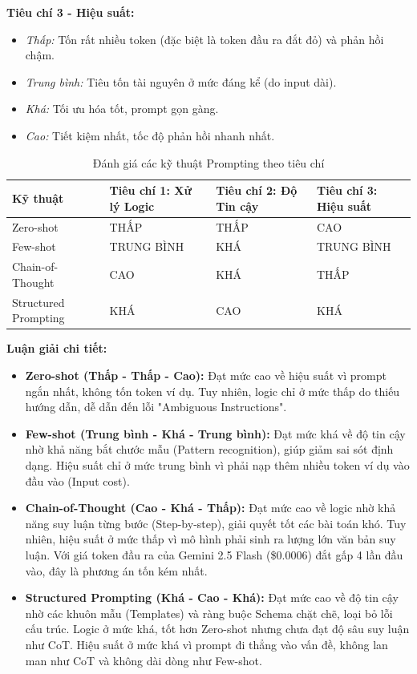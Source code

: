 \textbf{Tiêu chí 3 - Hiệu suất:}
\begin{itemize}
    \item \textit{Thấp:} Tốn rất nhiều token (đặc biệt là token đầu ra đắt đỏ) và phản hồi chậm.
    \item \textit{Trung bình:} Tiêu tốn tài nguyên ở mức đáng kể (do input dài).
    \item \textit{Khá:} Tối ưu hóa tốt, prompt gọn gàng.
    \item \textit{Cao:} Tiết kiệm nhất, tốc độ phản hồi nhanh nhất.
\end{itemize}

{\small
\begin{table}[htp]
\centering
\begin{tabular}{|p{4cm}|p{3.2cm}|p{3.2cm}|p{3.2cm}|}
\hline
\textbf{Kỹ thuật} & \textbf{Tiêu chí 1: Xử lý Logic} & \textbf{Tiêu chí 2: Độ Tin cậy} & \textbf{Tiêu chí 3: Hiệu suất} \\ \hline
Zero-shot & THẤP & THẤP & CAO \\ \hline
Few-shot & TRUNG BÌNH & KHÁ & TRUNG BÌNH \\ \hline
Chain-of-Thought & CAO & KHÁ & THẤP \\ \hline
Structured Prompting & KHÁ & CAO & KHÁ \\ \hline
\end{tabular}
\caption{Đánh giá các kỹ thuật Prompting theo tiêu chí}\label{tab:prompting-evaluation}
\end{table}
}
\textbf{Luận giải chi tiết:}
\begin{itemize}
    \item \textbf{Zero-shot (Thấp - Thấp - Cao):} Đạt mức cao về hiệu suất vì prompt ngắn nhất, không tốn token ví dụ. Tuy nhiên, logic chỉ ở mức thấp do thiếu hướng dẫn, dễ dẫn đến lỗi "Ambiguous Instructions".
    \item \textbf{Few-shot (Trung bình - Khá - Trung bình):} Đạt mức khá về độ tin cậy nhờ khả năng bắt chước mẫu (Pattern recognition), giúp giảm sai sót định dạng. Hiệu suất chỉ ở mức trung bình vì phải nạp thêm nhiều token ví dụ vào đầu vào (Input cost).
    \item \textbf{Chain-of-Thought (Cao - Khá - Thấp):} Đạt mức cao về logic nhờ khả năng suy luận từng bước (Step-by-step), giải quyết tốt các bài toán khó. Tuy nhiên, hiệu suất ở mức thấp vì mô hình phải sinh ra lượng lớn văn bản suy luận. Với giá token đầu ra của Gemini 2.5 Flash (\$0.0006) đắt gấp 4 lần đầu vào, đây là phương án tốn kém nhất.
    \item \textbf{Structured Prompting (Khá - Cao - Khá):} Đạt mức cao về độ tin cậy nhờ các khuôn mẫu (Templates) và ràng buộc Schema chặt chẽ, loại bỏ lỗi cấu trúc. Logic ở mức khá, tốt hơn Zero-shot nhưng chưa đạt độ sâu suy luận như CoT. Hiệu suất ở mức khá vì prompt đi thẳng vào vấn đề, không lan man như CoT và không dài dòng như Few-shot.
\end{itemize}

